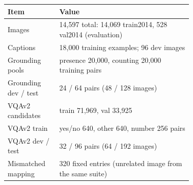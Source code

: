 \begin{tabular}{lp{0.72\linewidth}}
\toprule
Item & Value \\
\midrule
Images & 14,597 total: 14,069 train2014, 528 val2014 (evaluation) \\
Captions & 18,000 training examples; 96 dev images \\
Grounding pools & presence 20,000, counting 20,000 training pairs \\
Grounding dev / test & 24 / 64 pairs (48 / 128 images) \\
VQAv2 candidates & train 71,969, val 33,925 \\
VQAv2 train & yes/no 640, other 640, number 256 pairs \\
VQAv2 dev / test & 32 / 96 pairs (64 / 192 images) \\
Mismatched mapping & 320 fixed entries (unrelated image from the same suite) \\
\bottomrule
\end{tabular}